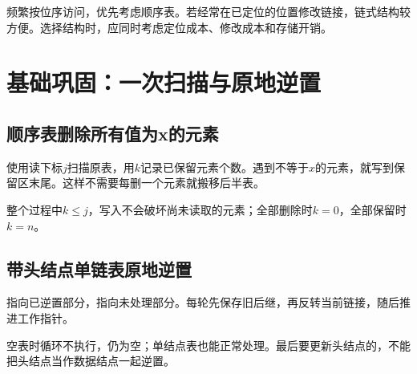 \hypertarget{ds2-choose}{}

\begin{takeaway}[选择结构的依据]
频繁按位序访问，优先考虑顺序表。若经常在已定位的位置修改链接，链式结构较方便。选择结构时，应同时考虑定位成本、修改成本和存储开销。
\end{takeaway}

\hypertarget{ds2-basic-algorithms}{}

\section{基础巩固：一次扫描与原地逆置}\label{ds2-basic-algorithms}

\hypertarget{ds2-delete-all}{}

\subsection{顺序表删除所有值为x的元素}\label{ds2-delete-all}

\hypertarget{ds2-delete-all-idea}{}

使用读下标$j$扫描原表，用$k$记录已保留元素个数。遇到不等于$x$的元素，就写到保留区末尾。这样不需要每删一个元素就搬移后半表。


\hypertarget{ds2-delete-all-code}{}

\Needspace{115.2pt}

\hypertarget{ds2-delete-all-boundary}{}

整个过程中$k\le j$，写入不会破坏尚未读取的元素；全部删除时$k=0$，全部保留时$k=n$。


\hypertarget{ds2-reverse}{}

\subsection{带头结点单链表原地逆置}\label{ds2-reverse}

\hypertarget{ds2-reverse-idea}{}

指向已逆置部分，指向未处理部分。每轮先保存旧后继，再反转当前链接，随后推进工作指针。


\hypertarget{ds2-reverse-code}{}

\Needspace{144.0pt}

\hypertarget{ds2-reverse-boundary}{}

空表时循环不执行，仍为空；单结点表也能正常处理。最后要更新头结点的，不能把头结点当作数据结点一起逆置。


